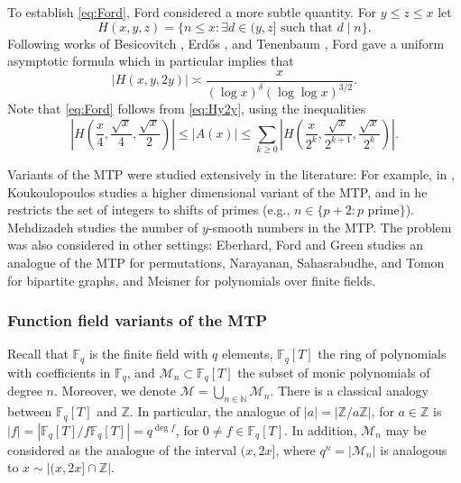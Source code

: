 \documentclass[12pt]{amsart}
\numberwithin{equation}{section}
\theoremstyle{definition}
\theoremstyle{remark}
\newcommand{\FF}{\mathbb{F}}
\newcommand{\ZZ}{\mathbb{Z}}
\newcommand{\NN}{\mathbb{N}}
\begin{document}
    To establish \eqref{eq:Ford}, Ford considered a more subtle quantity. For $y\leq z\leq x$ let
    \[
        H(x,y,z) = \{ n\leq x : \exists d\in (y,z] \mbox{ such that } d\mid n\}.
    \]
    Following works of Besicovitch \cite{besicovitch1935density}, Erd\H{o}s \cite{Erdos_MT}, and Tenenbaum  \cite{tenenbaum1980lois,tenenbaum1975repartition}, Ford gave a uniform asymptotic formula \cite[Theorem~1]{Ford_MT} which in particular implies that 
    \begin{equation}\label{eq:Hy2y}
        |H(x,y,2y)| \asymp \frac{x}{(\log x)^\delta (\log \log x)^{3/2}}.
    \end{equation}
    Note that \eqref{eq:Ford} follows from \eqref{eq:Hy2y}, using the inequalities
    \[
        \left|H\left(\frac{x}{4}, \frac{\sqrt{x}}{4}, \frac{\sqrt{x}}{2} \right) \right| \leq |A(x)| \leq \sum_{k \geq 0} \left| H \left(\frac{x}{2^k}, \frac{\sqrt{x}}{2^{k+1}}, \frac{\sqrt{x}}{2^k} \right) \right|.
    \]



    Variants of the MTP were studied extensively in the literature: For example, in \cite{Koukoulopoulos_generalized_MT,Koukoupoulos_localized_factorization}, Koukoulopoulos 
    studies a higher dimensional variant of the MTP, and in \cite{Koukoulopoulos_Divisors_of_shifted_primes} he restricts the set of integers to shifts of primes (e.g., $n\in \{p+2: p \mbox{ prime}\}$). Mehdizadeh \cite{smooth_numbers_MT} studies the  number of $y$-smooth numbers in the MTP. The problem was also considered in other settings: 
    Eberhard, Ford and Green \cite{permutations_MT} studies an analogue of the MTP for permutations, Narayanan,  Sahasrabudhe, and Tomon \cite{bipartite_grphs_MT} for bipartite graphs, and Meisner \cite{Meisner_MT} for polynomials over finite fields. 

    \subsubsection{Function field variants of the MTP}
    Recall that  $\mathbb{F}_q$ is the finite field with $q$  elements, $\FF_q[T]$ the ring of polynomials with coefficients in $\FF_q$, and $\mathcal{M}_n \subset \mathbb{F}_q[T]$ the subset of monic polynomials of degree $n$. Moreover, we denote $\mathcal{M}=\bigcup_{n\in \NN} \mathcal{M}_n$. There is a classical analogy between $\FF_q[T]$ and $\ZZ$. In particular, the analogue of $|a| = | \mathbb{Z}/a\mathbb{Z}|$, for $a\in \mathbb{Z}$ is $|f| = |\FF_q[T]/f\FF_q[T]| = q^{\deg f}$, for $0\neq f \in \FF_q[T]$. In addition, $\mathcal{M}_n$ may be considered as the analogue of the interval $(x,2x]$, where $q^n = |\mathcal{M}_n|$ is analogous to $x\sim |(x,2x]\cap \ZZ|$. 
\end{document}
